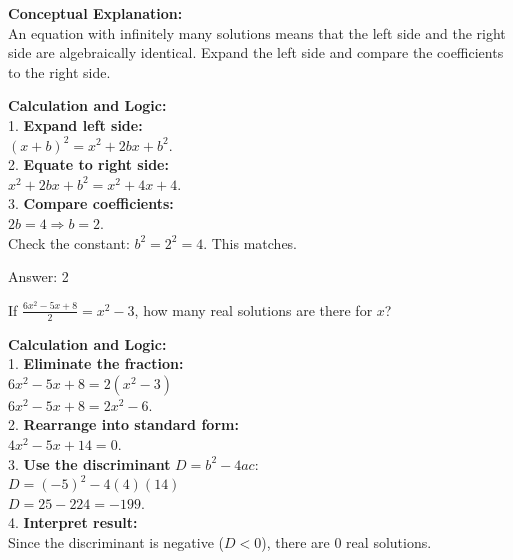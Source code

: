 \documentclass[11pt,paper=a4,answers]{exam}
\begin{document}
\begin{questions}
\begin{solution}
\textbf{Conceptual Explanation:} \\
An equation with infinitely many solutions means that the left side and the right side are algebraically identical. Expand the left side and compare the coefficients to the right side.

\vspace{30pt}

\textbf{Calculation and Logic:} \\
1. \textbf{Expand left side:} \\
   $(x + b)^2 = x^2 + 2bx + b^2$. \\
2. \textbf{Equate to right side:} \\
   $x^2 + 2bx + b^2 = x^2 + 4x + 4$. \\
3. \textbf{Compare coefficients:} \\
   $2b = 4 \Rightarrow b = 2$. \\
   Check the constant: $b^2 = 2^2 = 4$. This matches.

\vspace{30pt}

Answer: \colorbox{yellow!100}{2}
\end{solution}

\vspace{60pt}

\question
If $\frac{6x^2 - 5x + 8}{2} = x^2 - 3$, how many real solutions are there for $x$?

\begin{solution}
\textbf{Calculation and Logic:} \\
1. \textbf{Eliminate the fraction:} \\
   $6x^2 - 5x + 8 = 2(x^2 - 3)$ \\
   $6x^2 - 5x + 8 = 2x^2 - 6$. \\
2. \textbf{Rearrange into standard form:} \\
   $4x^2 - 5x + 14 = 0$. \\
3. \textbf{Use the discriminant } $D = b^2 - 4ac$: \\
   $D = (-5)^2 - 4(4)(14)$ \\
   $D = 25 - 224 = -199$. \\
4. \textbf{Interpret result:} \\
   Since the discriminant is negative ($D < 0$), there are 0 real solutions.

\vspace{30pt}


\end{solution}
\end{questions}
\end{document}
